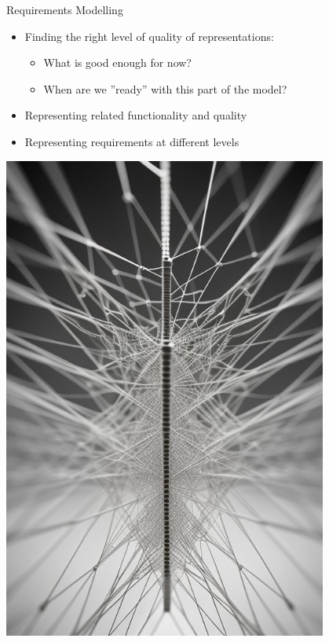 \documentclass{beamer}
\begin{document}
\begin{frame}[fragile]{Requirements Modelling}
\begin{minipage}[t]{0.6\textwidth}
\vspace{0pt}
\begin{itemize}
\item Finding the right level of quality of representations:
\begin{itemize}
\item What is good enough for now?
\item When are we ''ready'' with this part of the model?
\end{itemize}
\item Representing related functionality and quality
\item Representing requirements at different levels
\end{itemize}
\end{minipage}%
\begin{minipage}[t]{0.4\textwidth}
\vspace{0pt}
\hfill\includegraphics[width=0.8\textwidth]{img/network3.jpeg}
\end{minipage}%
\end{frame}
\end{document}
